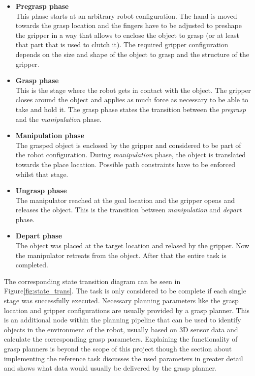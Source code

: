 \begin{itemize}

\item \textbf{Pregrasp phase} \\

This phase starts at an arbitrary robot configuration. The hand is moved towards the grasp location and the fingers have to be adjusted to preshape the gripper in a way that allows to enclose the object to grasp (or at least that part that is used to clutch it). The required gripper configuration depends on the size and shape of the object to grasp and the structure of the gripper.

\item \textbf{Grasp phase} \\

This is the stage where the robot gets in contact with the object. The gripper closes around the object and applies as much force as necessary to be able to take and hold it. The grasp phase states the transition between the \emph{pregrasp} and the \emph{manipulation} phase.

\item \textbf{Manipulation phase} \\

The grasped object is enclosed by the gripper and considered to be part of the robot configuration. 
During \emph{manipulation} phase, the object is translated towards the place location. Possible path constraints have to be enforced whilst that stage.

\item \textbf{Ungrasp phase} \\

The manipulator reached at the goal location and the gripper opens and releases the object. This is the transition between \emph{manipulation} and \emph{depart} phase.

\item \textbf{Depart phase} \\

The object was placed at the target location and relased by the gripper. Now the manipulator retreats from the object. After that the entire task is completed.

\end{itemize}

The corresponding state transition diagram can be seen in Figure\ref{fig:state_trans}. The task is only considered to be complete if each single stage was successfully executed. Necessary planning parameters like the grasp location and gripper configurations are usually provided by a grasp planner. This is an additional node within the planning pipeline that can be used to identify objects in the environment of the robot, usually based on 3D sensor data and calculate the corresponding grasp parameters. Explaining the functionality of grasp planners is beyond the scope of this project though the section about implementing the reference task discusses the used parameters in greater detail and shows what data would usually be delivered by the grasp planner. \\

